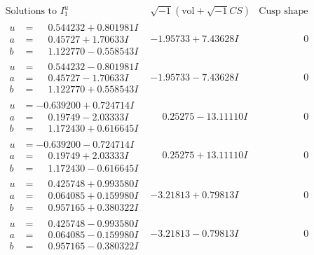 \documentclass[1p]{elsarticle_modified}
\theoremstyle{definition}
\newcommand{\I}{\sqrt{-1}}
\begin{document}
$$\begin{array}{c|c|c}  
\text{Solutions to }I^u_{1}& \I (\text{vol} + \sqrt{-1}CS) & \text{Cusp shape}\\
 \hline 
\begin{aligned}
u &= \phantom{-}0.544232 + 0.801981 I \\
a &= \phantom{-}0.45727 + 1.70633 I \\
b &= \phantom{-}1.122770 - 0.558543 I\end{aligned}
 & -1.95733 + 7.43628 I & \phantom{-0.000000 } 0 \\ \hline\begin{aligned}
u &= \phantom{-}0.544232 - 0.801981 I \\
a &= \phantom{-}0.45727 - 1.70633 I \\
b &= \phantom{-}1.122770 + 0.558543 I\end{aligned}
 & -1.95733 - 7.43628 I & \phantom{-0.000000 } 0 \\ \hline\begin{aligned}
u &= -0.639200 + 0.724714 I \\
a &= \phantom{-}0.19749 - 2.03333 I \\
b &= \phantom{-}1.172430 + 0.616645 I\end{aligned}
 & \phantom{-}0.25275 - 13.11110 I & \phantom{-0.000000 } 0 \\ \hline\begin{aligned}
u &= -0.639200 - 0.724714 I \\
a &= \phantom{-}0.19749 + 2.03333 I \\
b &= \phantom{-}1.172430 - 0.616645 I\end{aligned}
 & \phantom{-}0.25275 + 13.11110 I & \phantom{-0.000000 } 0 \\ \hline\begin{aligned}
u &= \phantom{-}0.425748 + 0.993580 I \\
a &= \phantom{-}0.064085 + 0.159980 I \\
b &= \phantom{-}0.957165 + 0.380322 I\end{aligned}
 & -3.21813 + 0.79813 I & \phantom{-0.000000 } 0 \\ \hline\begin{aligned}
u &= \phantom{-}0.425748 - 0.993580 I \\
a &= \phantom{-}0.064085 - 0.159980 I \\
b &= \phantom{-}0.957165 - 0.380322 I\end{aligned}
 & -3.21813 - 0.79813 I & \phantom{-0.000000 } 0 \\ \hline\begin{aligned}

\end{aligned}
\end{array}$$
\end{document}
